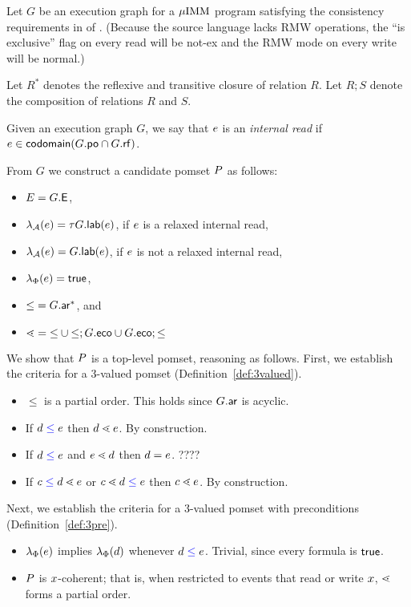 Let $G$ be an execution graph for a $\mu\text{IMM}$ program satisfying the
consistency requirements in  of
\citep{DBLP:journals/pacmpl/PodkopaevLV19}. (Because the source language
lacks RMW operations, the ``is exclusive'' flag on every read will be
\textsf{not-ex} and the RMW mode on every write will be \textsf{normal}.)

Let $R^*$ denotes the reflexive and transitive closure of relation $R$.  Let
$R;S$ denote the composition of relations $R$ and $S$.

Given an execution graph $G$, we say that $e$ is an \emph{internal read} if
$e\in\mathsf{codomain}(G.\mathsf{po}\cap G.\mathsf{rf})$.

From $G$ we construct a candidate pomset $P$ as follows:
\begin{itemize}
\item $E= G.\textsf{E}$,
\item $\lambda_{\mathcal{A}}(e)=\tau G.\mathsf{lab}(e)$, if $e$ is a relaxed
  internal read, 
\item $\lambda_{\mathcal{A}}(e)=G.\mathsf{lab}(e)$, if $e$ is not a relaxed
  internal read,
\item $\lambda_{\Phi}(e)=\mathsf{true}$,
\item ${\leq} = G.{\mathrel{\mathsf{ar}}}^*$, and
\item ${\lessdot} = {\leq} \cup {\leq}; {G.{\mathrel{\mathsf{eco}}}} \cup {G.{\ensuremath{\mathrel{\mathsf{eco}}}}} ; {\leq}$
\end{itemize}

We show that $P$ is a top-level pomset, reasoning as follows.
First, we establish the criteria for a 3-valued pomset (Definition~\ref{def:3valued}).
\begin{itemize}
\item ${\le}$ is a partial order.  This holds since $G.{\mathrel{\mathsf{ar}}}$ is acyclic.
\item If $d \mathrel{{\color{blue}\leq}} e$ then $d \lessdot e$.  By construction.
\item If $d \mathrel{{\color{blue}\leq}} e$ and $e \lessdot d$ then $d = e$.  ????
\item If $c \mathrel{{\color{blue}\leq}} d \lessdot e$ or $c \lessdot d \mathrel{{\color{blue}\leq}} e$ then
  $c \lessdot e$. By construction.
\end{itemize}

Next, we establish the criteria for a 3-valued pomset with preconditions (Definition~\ref{def:3pre}).
\begin{itemize}
\item $\lambda_{\Phi}(e)$ implies $\lambda_{\Phi}(d)$ whenever
  $d\mathrel{{\color{blue}\leq}}e$.   Trivial, since every formula is $\mathsf{true}$.
\item $P$ is $x$-coherent; that is, when restricted to events that
  read or write $x$, $\lessdot$ forms a partial order.
\end{itemize}

